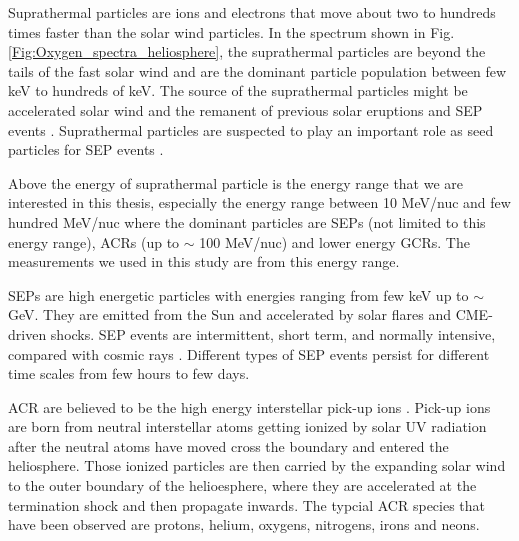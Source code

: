 
Suprathermal particles are ions and electrons that move about two to hundreds times faster than the solar wind particles. In the spectrum shown in Fig.\ref{Fig:Oxygen_spectra_heliosphere}, the suprathermal particles are beyond the tails of the fast solar wind and are the dominant particle population between few keV to hundreds of keV. The source of the suprathermal particles might be accelerated solar wind and the remanent of previous solar eruptions and \ac{SEP} events \citep{Gloeckler1995SSRv}. Suprathermal particles are suspected to play an important role as seed particles for \ac{SEP} events \citep{Kahler2019ApJ}.

Above the energy of suprathermal particle is the energy range that we are interested in this thesis, especially the energy range between 10 MeV/nuc and few hundred MeV/nuc where the dominant particles are \acp{SEP} (not limited to this energy range), \acp{ACR} (up to $\sim$ 100 MeV/nuc) and lower energy \acp{GCR}. The measurements we used in this study are from this energy range.

\acp{SEP} are high energetic particles with energies ranging from few keV up to $\sim$ GeV. They are emitted from the Sun and accelerated by solar flares and \ac{CME}-driven shocks. \acs{SEP} events are intermittent, short term, and normally intensive, compared with cosmic rays \citep{Reames1999}. Different types of \acs{SEP} events persist for different time scales from few hours to few days. %

\acs{ACR} are believed to be the high energy interstellar pick-up ions \citep{Giacalone2022SSRv}. Pick-up ions are born from neutral interstellar atoms getting ionized by solar UV radiation after the neutral atoms have moved cross the boundary and entered the heliosphere. Those ionized particles are then carried by the expanding solar wind to the outer boundary of the helioesphere, where they are accelerated at the termination shock and then propagate inwards. The typcial \ac{ACR} species that have been observed are protons, helium, oxygens, nitrogens, irons and neons. 

